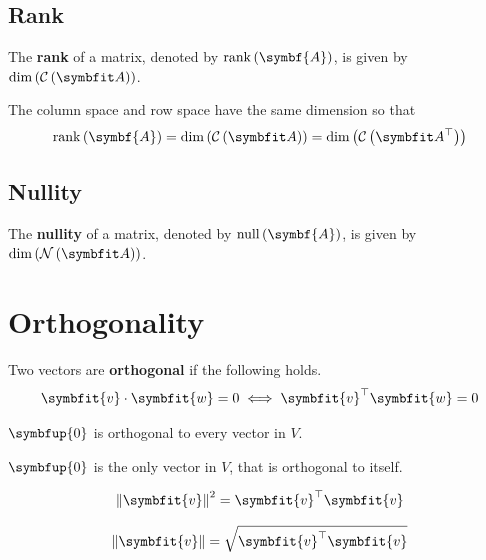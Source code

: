 \documentclass{article}
\begin{document}
\subsection{Rank}
\begin{definition}
    The \textbf{rank} of a matrix, denoted by
    \(\rank{\left( \symbf{A} \right)}\), is given by
    \(\dim{\left( \columnspace{A} \right)}\).
\end{definition}
\begin{theorem}
    The column space and row space have the same dimension so that
    \begin{equation*}
        \rank{\left( \symbf{A} \right)}=\dim{\left( \columnspace{A} \right)}=\dim{\left( \rowspace{A} \right)}
    \end{equation*}
\end{theorem}
\subsection{Nullity}
\begin{definition}
    The \textbf{nullity} of a matrix, denoted by
    \(\vnull{\left( \symbf{A} \right)}\), is given by
    \(\dim{\left( \nullspace{A} \right)}\).
\end{definition}
\newpage
\section{Orthogonality}
\begin{definition}
    Two vectors are \textbf{orthogonal} if the following holds.
    \begin{equation*}
        \symbfit{v}\cdot \symbfit{w}=0 \iff \symbfit{v}^{\top}\symbfit{w}=0
    \end{equation*}
\end{definition}
\begin{theorem}
    \(\symbfup{0}\) is orthogonal to every vector in \(V\).
\end{theorem}
\begin{theorem}
    \(\symbfup{0}\) is the only vector in \(V\), that is orthogonal to
    itself.
\end{theorem}
\begin{theorem}
    \begin{equation*}
        \norm{\symbfit{v}}^2=\symbfit{v}^{\top}\symbfit{v}
    \end{equation*}
\end{theorem}
\begin{theorem}
    \begin{equation*}
        \norm{\symbfit{v}}=\sqrt{\symbfit{v}^{\top}\symbfit{v}}
    \end{equation*}
\end{theorem}
\end{document}

